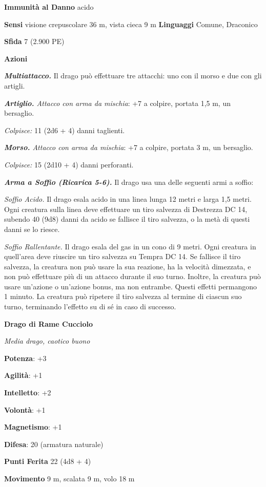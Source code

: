 \begin{multicols}{2}
\textbf{Immunità al Danno} acido

\textbf{Sensi} visione crepuscolare 36 m, vista cieca 9 m
\textbf{Linguaggi} Comune, Draconico

\textbf{Sfida} 7 (2.900 PE)

\textbf{Azioni}

\emph{\textbf{Multiattacco.}} Il drago può effettuare tre attacchi: uno
con il morso e due con gli artigli.

\emph{\textbf{Artiglio.} Attacco con arma da mischia}: +7 a colpire,
portata 1,5 m, un bersaglio.

\emph{Colpisce:} 11 (2d6 + 4) danni taglienti.

\emph{\textbf{Morso.} Attacco con arma da mischia}: +7 a colpire,
portata 3 m, un bersaglio.

\emph{Colpisce:} 15 (2d10 + 4) danni perforanti.

\emph{\textbf{Arma a Soffio (Ricarica 5-6).}} Il drago usa una delle
seguenti armi a soffio:

\emph{Soffio Acido.} Il drago esala acido in una linea lunga 12 metri e
larga 1,5 metri. Ogni creatura sulla linea deve effettuare un tiro
salvezza di Destrezza DC 14, subendo 40 (9d8) danni da acido se fallisce
il tiro salvezza, o la metà di questi danni se lo riesce.

\emph{Soffio Rallentante.} Il drago esala del gas in un cono di 9 metri.
Ogni creatura in quell'area deve riuscire un tiro salvezza su Tempra DC 14. Se fallisce il tiro salvezza, la creatura non può
usare la sua reazione, ha la velocità dimezzata, e non può effettuare
più di un attacco durante il suo turno. Inoltre, la creatura può usare
un'azione o un'azione bonus, ma non entrambe. Questi effetti permangono
1 minuto. La creatura può ripetere il tiro salvezza al termine di
ciascun suo turno, terminando l'effetto su di sé in caso di successo.

\textbf{Drago di Rame Cucciolo}

\emph{Media drago, caotico buono}

\textbf{Potenza}: +3

\textbf{Agilità}: +1

\textbf{Intelletto}: +2

\textbf{Volontà}: +1

\textbf{Magnetismo}: +1

\textbf{Difesa}: 20 (armatura naturale)

\textbf{Punti Ferita} 22 (4d8 + 4)

\textbf{Movimento} 9 m, scalata 9 m, volo 18 m


\end{multicols}
